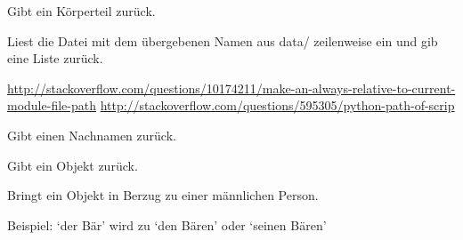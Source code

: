 \documentclass[a4paper,12pt,oneside]{sphinxmanual}
\begin{document}

\begin{fulllineitems}
\label{funktionen:pyzufall.koerperteil}
Gibt ein Körperteil zurück.

\end{fulllineitems}


\begin{fulllineitems}
\label{funktionen:pyzufall.lese}
Liest die Datei mit dem übergebenen Namen aus data/ zeilenweise ein und gib eine Liste zurück.

\href{http://stackoverflow.com/questions/10174211/make-an-always-relative-to-current-module-file-path}{http://stackoverflow.com/questions/10174211/make-an-always-relative-to-current-module-file-path}
\href{http://stackoverflow.com/questions/595305/python-path-of-scrip}{http://stackoverflow.com/questions/595305/python-path-of-scrip}

\end{fulllineitems}


\begin{fulllineitems}
\label{funktionen:pyzufall.nachname}
Gibt einen Nachnamen zurück.

\end{fulllineitems}


\begin{fulllineitems}
\label{funktionen:pyzufall.objekt}
Gibt ein Objekt zurück.

\end{fulllineitems}


\begin{fulllineitems}
\label{funktionen:pyzufall.objekt_m}
Bringt ein Objekt in Berzug zu einer männlichen Person.

Beispiel:
`der Bär' wird zu `den Bären' oder `seinen Bären'

\end{fulllineitems}
\end{document}
